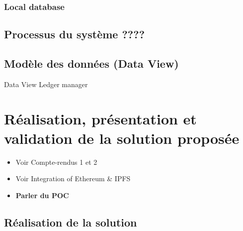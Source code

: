 \documentclass{tnreport}
\begin{document}
\subsection{Local database}

\section{Processus du système ????}

\section{Modèle des données (Data View)}

Data View
Ledger manager

\chapter{Réalisation, présentation et validation de la solution proposée}
\label{sec:realisation}

\begin{itemize}
	\item Voir Compte-rendus 1 et 2
	\item Voir Integration of Ethereum \& IPFS
	\item \textbf{Parler du POC}
\end{itemize}

\section{Réalisation de la solution}
\end{document}
